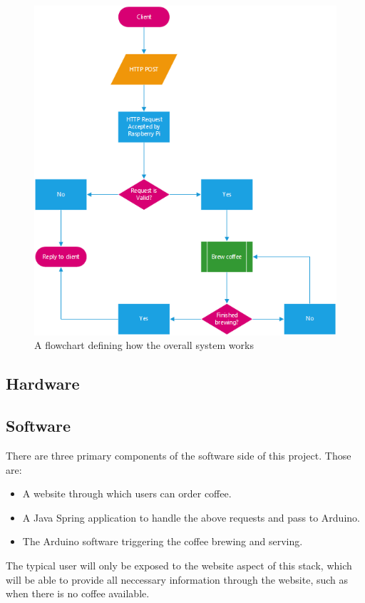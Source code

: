\documentclass[11pt, a4paper]{article}
\begin{document}
\begin{figure}[H]
    \centering    
    \includegraphics[scale=0.95]{images/flowchart}
    \caption{A flowchart defining how the overall system works}
\end{figure}

\newpage


\subsection{Hardware}

\newpage


\subsection{Software}
There are three primary components of the software side of this project. Those
are:
\begin{itemize}
	\item A website through which users can order coffee.
	\item A Java Spring application to handle the above requests and pass to
	Arduino.
	\item The Arduino software triggering the coffee brewing and serving.
\end{itemize}
The typical user will only be exposed to the website aspect of this stack, which
will be able to provide all neccessary information through the website, such as
when there is no coffee available.
\end{document}
